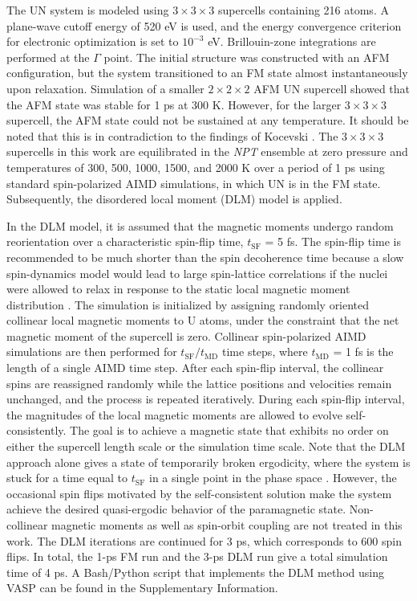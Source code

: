 \documentclass[preprint, 12pt]{elsarticle}
\newcommand{\?}{\stackrel{?}{=}}
\begin{document}
The UN system is modeled using \( 3 \times 3 \times 3 \) supercells containing 216 atoms. A plane-wave cutoff energy of 520 eV is used, and the energy convergence criterion for electronic optimization is set to \( 10^{-3} \) eV. Brillouin-zone integrations are performed at the \( \Gamma \) point. The initial structure was constructed with an AFM configuration, but the system transitioned to an FM state almost instantaneously upon relaxation. Simulation of a smaller \( 2 \times 2 \times 2 \) AFM UN supercell showed that the AFM state was stable for 1 ps at 300 K. However, for the larger \( 3 \times 3 \times 3 \) supercell, the AFM state could not be sustained at any temperature. It should be noted that this is in contradiction to the findings of Kocevski \cite{Kocevski2023}. The \( 3 \times 3 \times 3 \) supercells in this work are equilibrated in the \textit{NPT} ensemble at zero pressure and temperatures of 300, 500, 1000, 1500, and 2000 K over a period of 1 ps using standard spin-polarized AIMD simulations, in which UN is in the FM state. Subsequently, the disordered local moment (DLM) model is applied.

In the DLM model, it is assumed that the magnetic moments undergo random reorientation over a characteristic spin-flip time, \( t_\mathrm{SF} \) = 5 fs. The spin-flip time is recommended to be much shorter than the spin decoherence time because a slow spin-dynamics model would lead to large spin-lattice correlations if the nuclei were allowed to relax in response to the static local magnetic moment distribution \cite{Steneteg2012}. The simulation is initialized by assigning randomly oriented collinear local magnetic moments to U atoms, under the constraint that the net magnetic moment of the supercell is zero. Collinear spin-polarized AIMD simulations are then performed for \( t_\mathrm{SF} / t_\mathrm{MD} \) time steps, where \( t_\mathrm{MD} \) = 1 fs is the length of a single AIMD time step. After each spin-flip interval, the collinear spins are reassigned randomly while the lattice positions and velocities remain unchanged, and the process is repeated iteratively. During each spin-flip interval, the magnitudes of the local magnetic moments are allowed to evolve self-consistently. The goal is to achieve a magnetic state that exhibits no order on either the supercell length scale or the simulation time scale. Note that the DLM approach alone gives a state of temporarily broken ergodicity, where the system is stuck for a time equal to $t_\mathrm{SF}$ in a single point in the phase space \cite{Gyorffy1985, Abrikosov2016}. However, the occasional spin flips motivated by the self-consistent solution make the system achieve the desired quasi-ergodic behavior of the paramagnetic state. Non-collinear magnetic moments as well as spin-orbit coupling are not treated in this work. The DLM iterations are continued for 3 ps, which corresponds to 600 spin flips. In total, the 1-ps FM run and the 3-ps DLM run give a total simulation time of 4 ps. A Bash/Python script that implements the DLM method using VASP can be found in the Supplementary Information.
\end{document}
